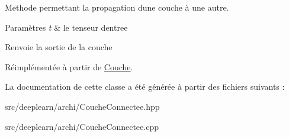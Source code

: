 Methode permettant la propagation d\textquotesingle{}une couche à une autre. 


\begin{DoxyParams}{Paramètres}
{\em t} & le tenseur d\textquotesingle{}entree \\
\hline
\end{DoxyParams}
\begin{DoxyReturn}{Renvoie}
la sortie de la couche 
\end{DoxyReturn}


Réimplémentée à partir de \hyperlink{classCouche_a1f0ed59e21020f5d4f37933af4d1b1e5}{Couche}.



La documentation de cette classe a été générée à partir des fichiers suivants \+:\begin{DoxyCompactItemize}
\item 
src/deeplearn/archi/Couche\+Connectee.\+hpp\item 
src/deeplearn/archi/Couche\+Connectee.\+cpp\end{DoxyCompactItemize}
